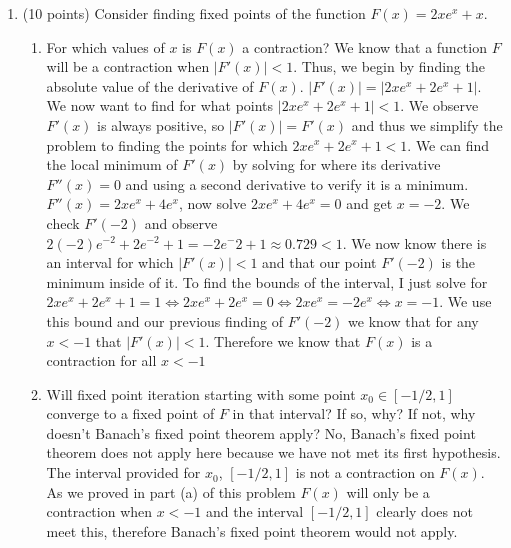 \documentclass{article}
\begin{document}
\begin{enumerate}
\begin{enumerate}
    \end{enumerate}
    \newpage
    \item (10 points) Consider finding fixed points of the function $F(x) = 2xe^x + x$.
    \begin{enumerate}
        \item For which values of $x$ is $F(x)$ a contraction?
        \newline
        \newline
        We know that a function $F$ will be a contraction when $|F'(x)| < 1$. Thus, we begin by finding the absolute value of the derivative of $F(x)$. $|F'(x)| = |2xe^x + 2e^x + 1|$. We now want to find for what points $|2xe^x + 2e^x + 1| < 1$. We observe $F'(x)$ is always positive, so $|F'(x)| = F'(x)$ and thus we simplify the problem to finding the points for which $2xe^x + 2e^x + 1 < 1$. We can find the local minimum of $F'(x)$ by solving for where its derivative $F''(x) = 0$ and using a second derivative to verify it is a minimum. $F''(x) = 2xe^x + 4e^x$, now solve $2xe^x + 4e^x = 0$ and get $x=-2$. We check $F'(-2)$ and observe $2(-2)e^{-2} + 2e^{-2} + 1 = -2e^-2 + 1 \approx 0.729 < 1$. We now know there is an interval for which $|F'(x)| < 1$ and that our point $F'(-2)$ is the minimum inside of it. To find the bounds of the interval, I just solve for $2xe^x + 2e^x + 1 = 1 \Leftrightarrow 2xe^x + 2e^x = 0 \Leftrightarrow 2xe^x = -2e^x \Leftrightarrow x = -1$. We use this bound and our previous finding of $F'(-2)$ we know that for any $x < -1$ that $|F'(x)| < 1$. Therefore we know that $F(x)$ is a contraction for all $x<-1$
        
        \item Will fixed point iteration starting with some point $x_0\in [-1/2, 1]$ converge to a fixed point of $F$ in that interval? If so, why? If not, why doesn’t Banach’s fixed point theorem apply?
        \newline
        \newline
        No, Banach’s fixed point theorem does not apply here because we have not met its first hypothesis. The interval provided for $x_0$, $[-1/2, 1]$ is not a contraction on $F(x)$. As we proved in part (a) of this problem $F(x)$ will only be a contraction when $x < -1$ and the interval $[-1/2, 1]$ clearly does not meet this, therefore Banach’s fixed point theorem would not apply. 
    \end{enumerate}
    

\end{enumerate}
\end{document}
